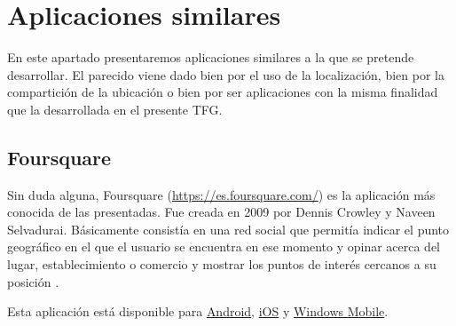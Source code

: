 \section{Aplicaciones similares}
En este apartado presentaremos aplicaciones similares a la que se pretende desarrollar. El parecido viene dado bien por el uso de la localización, bien por la compartición de la ubicación o bien por ser aplicaciones con la misma finalidad que la desarrollada en el presente \ac{TFG}.

\subsection{Foursquare}
Sin duda alguna, Foursquare (\url{https://es.foursquare.com/}) es la aplicación más conocida de las presentadas. Fue creada en 2009 por Dennis Crowley y Naveen Selvadurai. Básicamente consistía en una red social que permitía indicar el punto geográfico en el que el usuario se encuentra en ese momento\cite{Rubi13} y opinar acerca del lugar, establecimiento o comercio y mostrar los puntos de interés cercanos a su posición \cite{Cano14}. 

Esta aplicación está disponible para \href{https://play.google.com/store/apps/details?id=com.joelapenna.foursquared}{Android}, \href{https://itunes.apple.com/us/app/id306934924?mt=8}{iOS} y \href{https://www.microsoft.com/es-es/store/apps/foursquare/9wzdncrfhw3v}{Windows Mobile}.

